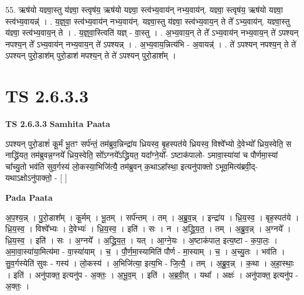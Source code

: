 \documentclass[17pt]{extarticle}
\begin{document}
55. ऋष॑यो यज्ञ्वा॒स्तु य॑ज्ञ्वा॒ स्त्वृष॑य॒ ऋष॑यो यज्ञ्वा॒ स्त्व॑भ्य॒वाय॑न् नभ्य॒वाय॑न्. यज्ञ्वा॒ स्त्वृष॑य॒ ऋष॑यो यज्ञ्वा॒ स्त्व॑भ्य॒वायन्न्॑ । . य॒ज्ञ्॒वा॒ स्त्व॑भ्य॒वाय॑न् नभ्य॒वाय॑न्. यज्ञ्वा॒स्तु य॑ज्ञ्वा॒ स्त्व॑भ्य॒वाय॒न् ते ते᳚ ऽभ्य॒वाय॑न्. यज्ञ्वा॒स्तु य॑ज्ञ्वा॒ स्त्व॑भ्य॒वाय॒न् ते । . य॒ज्ञ्॒वा॒स्त्विति॑ यज्ञ् - वा॒स्तु । . अ॒भ्य॒वाय॒न् ते ते᳚ ऽभ्य॒वाय॑न् नभ्य॒वाय॒न् ते॑ ऽपश्यन् नपश्य॒न् ते᳚ ऽभ्य॒वाय॑न् नभ्य॒वाय॒न् ते॑ ऽपश्यन्न् । . अ॒भ्य॒वाय॒न्नित्य॑भि - अ॒वायन्न्॑ । . ते॑ ऽपश्यन् नपश्य॒न् ते ते॑ ऽपश्यन् पुरो॒डाश॑म् पुरो॒डाश॑ मपश्य॒न् ते ते॑ ऽपश्यन् पुरो॒डाश᳚म् । \newline
\pagebreak
{}

\section{ TS 2.6.3.3 }

\textbf{TS 2.6.3.3 } \newline
\textbf{Samhita Paata} \newline

ऽपश्यन् पुरो॒डाशं॑ कू॒र्मं भू॒तꣳ सर्प॑न्तं॒ तम॑ब्रुव॒न्निन्द्रा॑य ध्रियस्व॒ बृ॒हस्पत॑ये ध्रियस्व॒ विश्वे᳚भ्यो दे॒वेभ्यो᳚ ध्रिय॒स्वेति॒ स नाद्ध्रि॑यत॒ तम॑ब्रुवन्न॒ग्नये᳚ ध्रिय॒स्वेति॒ सो᳚ऽग्नये᳚ऽद्ध्रियत॒ यदा᳚ग्ने॒यो᳚- ऽष्टाक॑पालो- ऽमावा॒स्या॑यां च पौर्णमा॒स्यां चा᳚च्यु॒तो भव॑ति सुव॒र्गस्य॑ लो॒कस्या॒भिजि॑त्यै॒ तम॑ब्रुवन् क॒थाऽहा᳚स्था॒ इत्यनु॑पाक्तो ऽभूव॒मित्य॑ब्रवी॒द्-यथाऽक्षोऽनु॑पाक्तो॒ - [  ] \newline

\textbf{Pada Paata} \newline

अ॒प॒श्य॒न्न् । पु॒रो॒डाश᳚म् । कू॒र्मम् । भू॒तम् । सर्प॑न्तम् । तम् । अ॒ब्रु॒व॒न्न् । इन्द्रा॑य । ध्रि॒य॒स्व॒ । बृह॒स्पत॑ये । ध्रि॒य॒स्व॒ । विश्वे᳚भ्यः । दे॒वेभ्यः॑ । ध्रि॒य॒स्व॒ । इति॑ । सः । न । अ॒द्ध्रि॒य॒त॒ । तम् । अ॒ब्रु॒व॒न्न् । अ॒ग्नये᳚ । ध्रि॒य॒स्व॒ । इति॑ । सः । अ॒ग्नये᳚ । अ॒द्ध्रि॒य॒त॒ । यत् । आ॒ग्ने॒यः । अ॒ष्टाक॑पाल॒ इत्य॒ष्टा - क॒पा॒लः॒ । अ॒मा॒वा॒स्या॑या॒मित्य॑मा - वा॒स्या॑याम् । च॒ । पौ॒र्ण॒मा॒स्यामिति॑ पौर्ण - मा॒स्याम् । च॒ । अ॒च्यु॒तः । भव॑ति । सु॒व॒र्गस्येति॑ सुवः - गस्य॑ । लो॒कस्य॑ । अ॒भिजि॑त्या॒ इत्य॒भि - जि॒त्यै॒ । तम् । अ॒ब्रु॒व॒न्न् । क॒था । अ॒हा॒स्थाः॒ । इति॑ । अनु॑पाक्त॒ इत्यनु॑प - अ॒क्तः॒ । अ॒भू॒व॒म् । इति॑ । अ॒ब्र॒वी॒त् । यथा᳚ । अक्षः॑ । अनु॑पाक्त॒ इत्यनु॑प - अ॒क्तः॒ ।  \newline
\end{document}
